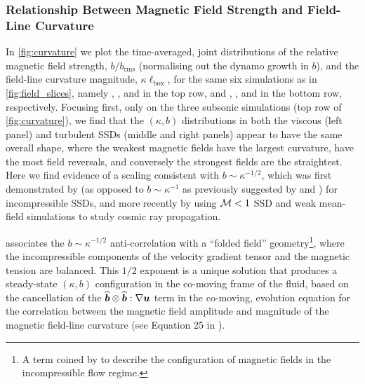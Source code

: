 \subsubsection{Relationship Between Magnetic Field Strength and Field-Line Curvature}

In \autoref{fig:curvature} we plot the time-averaged, joint distributions of the relative magnetic field strength, $b/b_\mathrm{rms}$ (normalising out the dynamo growth in $b$), and the field-line curvature magnitude, $\kappa \ell_\mathrm{box}$, for the same six simulations as in \autoref{fig:field_slices}, namely , , and  in the top row, and , , and  in the bottom row, respectively. Focusing first, only on the three subsonic simulations (top row of \autoref{fig:curvature}), we find that the $(\kappa,b)$ distributions in both the viscous (left panel) and turbulent SSDs (middle and right panels) appear to have the same overall shape, where the weakest magnetic fields have the largest curvature, \eg have the most field reversals, and conversely the strongest fields are the straightest. Here we find evidence of a scaling consistent with $b \sim \kappa^{-1/2}$, which was first demonstrated by \citet{schekochihin2004simulations} (as opposed to $b \sim \kappa^{-1}$ as previously suggested by \citealt{brandenburg1995size} and \citealt{schekochihin2002small}) for incompressible SSDs, and more recently by \citet{kempski2023cosmic} using $\mathcal{M} < 1$ SSD and weak mean-field simulations to study cosmic ray propagation.

\citet{schekochihin2004simulations} associates the $b \sim \kappa^{-1/2}$ anti-correlation with a ``folded field'' geometry\footnote{
    A term coined by \citet{schekochihin2004simulations} to describe the configuration of magnetic fields in the incompressible flow regime.
}, where the incompressible components of the velocity gradient tensor \citep[see][]{beattie2023bulk} and the magnetic tension are balanced. This $1/2$ exponent is a unique solution that produces a steady-state $(\kappa, b)$ configuration in the co-moving frame of the fluid, based on the cancellation of the $\widehat{\bm{b}}\otimes\widehat{\bm{b}}:\nabla\bm{u}$ term in the co-moving, evolution equation for the correlation between the magnetic field amplitude and magnitude of the magnetic field-line curvature (see Equation 25 in \citealt{schekochihin2004simulations}).

